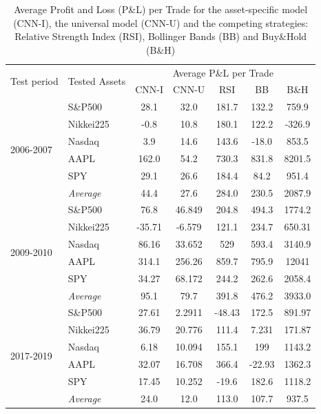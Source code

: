 \documentclass[11pt, a4paper]{article}
\begin{document}
\begin{table}[H]
\centering
\begin{tabular}{l|l|ccccc}
        \multicolumn{1}{m{1cm}|}{\multirow{2}{1cm}{Test period}} & \multicolumn{1}{m{1.5cm}|}{\multirow{2}{1.5cm}{Tested Assets}}  &       \multicolumn{5}{c}{Average P\&L per Trade}  \\ \cline{3-7}
          &           & CNN-I   & CNN-U   & RSI     & BB      & B\&H    \\
          \hline \hline
\multirow{6}{1cm}{2006-2007} & S\&P500   & 28.1   & 32.0   & 181.7  & 132.2  & 759.9  \\
          & Nikkei225 &-0.8   & 10.8   & 180.1  & 122.2  & -326.9 \\
          & Nasdaq   & 3.9    & 14.6   & 143.6  & -18.0  & 853.5  \\
          & AAPL     & 162.0  & 54.2   & 730.3  & 831.8  & 8201.5 \\
          & SPY       & 29.1   & 26.6   & 184.4  & 84.2   & 951.4  \\
          \cline{2-7}
          & \textit{Average}    & 44.4   & 27.6   & 284.0  & 230.5  & 2087.9 \\
          \hline
\multirow{6}{1cm}{2009-2010} & S\&P500   & 76.8   & 46.849 & 204.8  & 494.3  & 1774.2 \\
          & Nikkei225  & -35.71 & -6.579 & 121.1  & 234.7  & 650.31 \\
          & Nasdaq    & 86.16  & 33.652 & 529    & 593.4  & 3140.9 \\
          & AAPL      & 314.1  & 256.26 & 859.7  & 795.9  & 12041  \\
          & SPY       & 34.27  & 68.172 & 244.2  & 262.6  & 2058.4 \\
          \cline{2-7}
          & \textit{Average}  & 95.1   & 79.7   & 391.8  & 476.2  & 3933.0 \\
\hline
\multirow{6}{1cm}{2017-2019}   & S\&P500  & 27.61  & 2.2911 & -48.43 & 172.5  & 891.97 \\
          & Nikkei225 & 36.79  & 20.776 & 111.4  & 7.231  & 171.87 \\
          & Nasdaq    & 6.18   & 10.094 & 155.1  & 199    & 1143.2 \\
          & AAPL    & 32.07  & 16.708 & 366.4  & -22.93 & 1362.3 \\
          & SPY   & 17.45  & 10.252 & -19.6  & 182.6  & 1118.2 \\
          \cline{2-7}
          & \textit{Average}   & 24.0   & 12.0   & 113.0  & 107.7  & 937.5 
\end{tabular}
\caption{Average Profit and Loss (P\&L) per Trade for the asset-specific model (CNN-I), the universal model (CNN-U) and the competing strategies: Relative Strength Index (RSI), Bollinger Bands (BB) and Buy\&Hold (B\&H)}
\label{tbl:PandLAvg}
\end{table}
\end{document}
